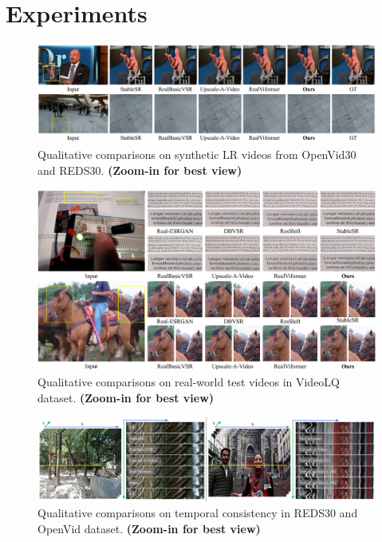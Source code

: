 
\section{Experiments}

\begin{figure}[t!]
    \centering
    \includegraphics[width=1\linewidth]{figure/qualitive1.pdf}
    \caption{Qualitative comparisons on synthetic LR videos from OpenVid30 and REDS30\cite{nah2019ntire}. \textbf{(Zoom-in for best view)}}
    \label{fig:qualitive1}
\end{figure}

\begin{figure}[t!]
    \centering
    \includegraphics[width=1\linewidth]{figure/qualitive2.pdf}
    \caption{Qualitative comparisons on real-world test videos in VideoLQ \cite{chan2022investigating} dataset. \textbf{(Zoom-in for best view)}}
    \label{fig:qualitive2}
\end{figure}

\begin{figure}
    \centering
    \includegraphics[width=\linewidth]{figure/temporal.pdf}
    \caption{Qualitative comparisons on temporal consistency in REDS30 \cite{nah2019ntire} and OpenVid dataset. \textbf{(Zoom-in for best view)}}
    \label{fig:temp_consis}
\end{figure}

